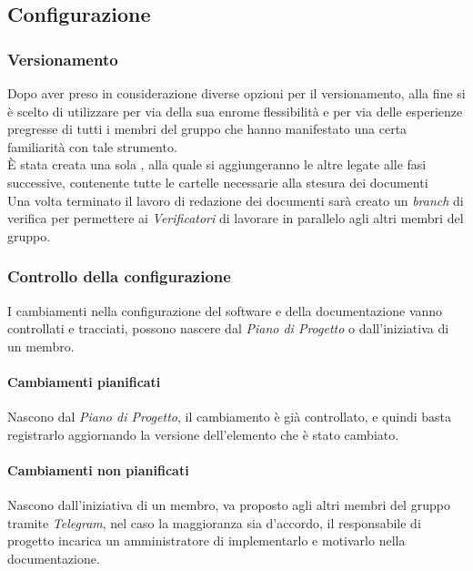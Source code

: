     
    \subsection{Configurazione}
      
    \subsubsection{Versionamento}
      Dopo aver preso in considerazione diverse opzioni per il versionamento, alla fine si è scelto di utilizzare \textbf{} per via della
      sua enrome flessibilità e per via delle esperienze pregresse di tutti i membri del gruppo che hanno manifestato una certa familiarità con
      tale strumento.\\
      È stata creata una sola , alla quale si aggiungeranno le altre legate alle fasi successive, contenente tutte le cartelle necessarie
      alla stesura dei documenti \glossaryItem{\LaTeX}\.\\
      Una volta terminato il lavoro di redazione dei documenti sarà creato un \emph{branch} di verifica per permettere ai \emph{Verificatori} di
      lavorare in parallelo agli altri membri del gruppo.
      
      \subsubsection{Controllo della configurazione}
      I cambiamenti nella configurazione del software e della documentazione vanno controllati e tracciati, possono nascere dal \emph{Piano di Progetto} o dall'iniziativa di un membro.
      \paragraph{Cambiamenti pianificati}
	Nascono dal \emph{Piano di Progetto}, il cambiamento è già controllato, e quindi basta registrarlo aggiornando la versione dell'elemento che è stato cambiato.
	\paragraph{Cambiamenti non pianificati}
	Nascono dall'iniziativa di un membro, va proposto agli altri membri del gruppo tramite \emph{Telegram}, nel caso la maggioranza sia d'accordo, il responsabile di progetto incarica un amministratore di implementarlo e motivarlo nella documentazione.




